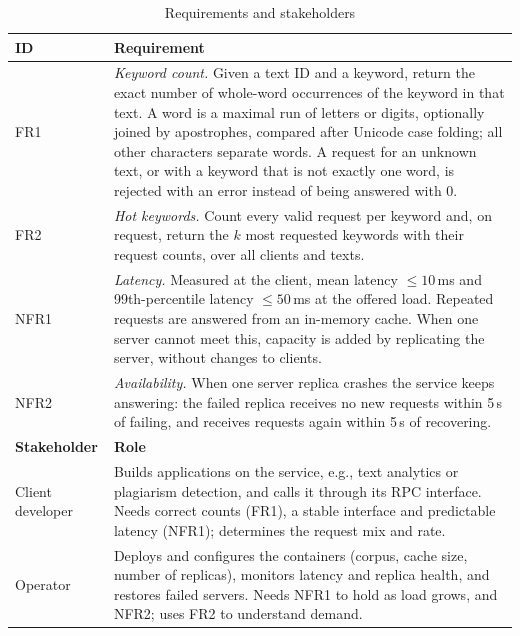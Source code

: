 \begin{table}[t]
\caption{Requirements and stakeholders}
\label{tab:requirements}
\centering
\footnotesize
\begin{tabular}{@{}p{}p{}@{}}
\hline
\textbf{ID} & \textbf{Requirement} \\
\hline
FR1 & \emph{Keyword count.} Given a text ID and a keyword, return the exact
number of whole-word occurrences of the keyword in that text. A word is a maximal
run of letters or digits, optionally joined by apostrophes, compared after Unicode
case folding; all other characters separate words. A request for an unknown text,
or with a keyword that is not exactly one word, is rejected with an error instead
of being answered with 0. \\
FR2 & \emph{Hot keywords.} Count every valid request per keyword and, on request,
return the $k$ most requested keywords with their request counts, over all
clients and texts. \\
NFR1 & \emph{Latency.} Measured at the client, mean latency $\le 10$\,ms and
99th-percentile latency $\le 50$\,ms at the offered load. Repeated requests are
answered from an in-memory cache. When one server cannot meet this, capacity is
added by replicating the server, without changes to clients. \\
NFR2 & \emph{Availability.} When one server replica crashes the service keeps
answering: the failed replica receives no new requests within 5\,s of failing,
and receives requests again within 5\,s of recovering. \\
\hline
\textbf{Stakeholder} & \textbf{Role} \\
\hline
\raggedright Client developer & Builds applications on the service, e.g., text analytics or
plagiarism detection, and calls it through its RPC interface. Needs correct counts
(FR1), a stable interface and predictable latency (NFR1); determines the request
mix and rate. \\
Operator & Deploys and configures the containers (corpus, cache size, number of
replicas), monitors latency and replica health, and restores failed servers.
Needs NFR1 to hold as load grows, and NFR2; uses FR2 to understand demand. \\
\hline
\end{tabular}
\end{table}

